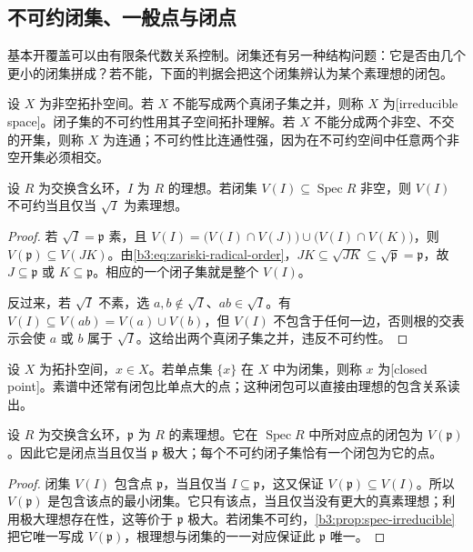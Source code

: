 \subsection{不可约闭集、一般点与闭点}
\label{b3:subsec:0103:03}

基本开覆盖可以由有限条代数关系控制。闭集还有另一种结构问题：它是否由几个更小的闭集拼成？若不能，下面的判据会把这个闭集辨认为某个素理想的闭包。

\begin{definition}\label{b3:def:irreducible-space}
	设 \(X\) 为非空拓扑空间。若 \(X\) 不能写成两个真闭子集之并，则称 \(X\) 为[irreducible space]。闭子集的不可约性用其子空间拓扑理解。若 \(X\) 不能分成两个非空、不交的开集，则称 \(X\) 为连通；不可约性比连通性强，因为在不可约空间中任意两个非空开集必须相交。
\end{definition}

\begin{proposition}\label{b3:prop:spec-irreducible}
	设 \(R\) 为交换含幺环，\(I\) 为 \(R\) 的理想。若闭集 \(V(I)\subseteq\operatorname{Spec}R\) 非空，则 \(V(I)\) 不可约当且仅当 \(\sqrt I\) 为素理想。
\end{proposition}
\begin{proof}
	若 \(\sqrt I=\mathfrak p\) 素，且 \(V(I)=\bigl(V(I)\cap V(J)\bigr)\cup\bigl(V(I)\cap V(K)\bigr)\)，则 \(V(\mathfrak p)\subseteq V(JK)\)。由\eqref{b3:eq:zariski-radical-order}，\(JK\subseteq\sqrt{JK}\subseteq\sqrt{\mathfrak p}=\mathfrak p\)，故 \(J\subseteq\mathfrak p\) 或 \(K\subseteq\mathfrak p\)。相应的一个闭子集就是整个 \(V(I)\)。

	反过来，若 \(\sqrt I\) 不素，选 \(a,b\notin\sqrt I\)、\(ab\in\sqrt I\)。有 \(V(I)\subseteq V(ab)=V(a)\cup V(b)\)，但 \(V(I)\) 不包含于任何一边，否则根的交表示会使 \(a\) 或 \(b\) 属于 \(\sqrt I\)。这给出两个真闭子集之并，违反不可约性。
\end{proof}

设 \(X\) 为拓扑空间，\(x\in X\)。若单点集 \(\{x\}\) 在 \(X\) 中为闭集，则称 \(x\) 为[closed point]。素谱中还常有闭包比单点大的点；这种闭包可以直接由理想的包含关系读出。

\begin{proposition}\label{b3:prop:generic-and-closed-points}
	设 \(R\) 为交换含幺环，\(\mathfrak p\) 为 \(R\) 的素理想。它在 \(\operatorname{Spec}R\) 中所对应点的闭包为 \(V(\mathfrak p)\)。因此它是闭点当且仅当 \(\mathfrak p\) 极大；每个不可约闭子集恰有一个闭包为它的点。
\end{proposition}
\begin{proof}
	闭集 \(V(I)\) 包含点 \(\mathfrak p\)，当且仅当 \(I\subseteq\mathfrak p\)，这又保证 \(V(\mathfrak p)\subseteq V(I)\)。所以 \(V(\mathfrak p)\) 是包含该点的最小闭集。它只有该点，当且仅当没有更大的真素理想；利用极大理想存在性，这等价于 \(\mathfrak p\) 极大。若闭集不可约，\cref{b3:prop:spec-irreducible}把它唯一写成 \(V(\mathfrak p)\)，根理想与闭集的一一对应保证此 \(\mathfrak p\) 唯一。
\end{proof}

